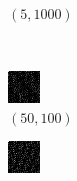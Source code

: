 \documentclass[a4paper, landscape]{article}
\begin{document}
\begin{figure}[H]
\begin{subfigure}{0.07\linewidth}
        \caption*{$(5, 1000)$}
    \end{subfigure}
    \\
    \begin{subfigure}{0.07\linewidth}
        \centering
        \includegraphics[width=\linewidth]{iht/k = 50, m = 100.png}
        \caption*{$(50, 100)$}
    \end{subfigure}
    \begin{subfigure}{0.07\linewidth}
        \centering
        \includegraphics[width=\linewidth]{iht/k = 50, m = 200.png}

\end{subfigure}
\end{figure}
\end{document}
